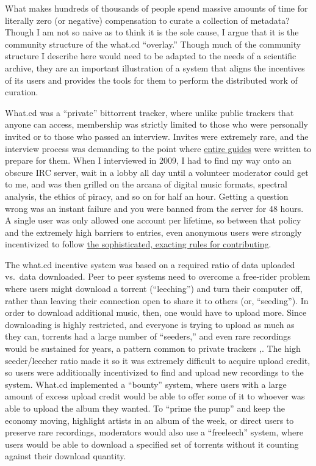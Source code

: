 \documentclass[nohyper]{tufte-book-jls}
\begin{document}
What makes hundreds of thousands of people spend massive amounts of time
for literally zero (or negative) compensation to curate a collection of
metadata? Though I am not so naive as to think it is the sole cause, I
argue that it is the community structure of the what.cd ``overlay.''
Though much of the community structure I describe here would need to be
adapted to the needs of a scientific archive, they are an important
illustration of a system that aligns the incentives of its users and
provides the tools for them to perform the distributed work of curation.

What.cd was a ``private'' bittorrent tracker, where unlike public
trackers that anyone can access, membership was strictly limited to
those who were personally invited or to those who passed an interview.
Invites were extremely rare, and the interview process was demanding to
the point where
\href{https://opentrackers.org/whatinterviewprep.com/index.html}{entire
guides} were written to prepare for them. When I interviewed in 2009, I
had to find my way onto an obscure IRC server, wait in a lobby all day
until a volunteer moderator could get to me, and was then grilled on the
arcana of digital music formats, spectral analysis, the
ethics of piracy, and so on for half an hour. Getting a question wrong
was an instant failure and you were banned from the server for 48 hours.
A single user was only allowed one account per lifetime, so between that
policy and the extremely high barriers to entries, even anonymous users
were strongly incentivized to follow
\href{https://opentrackers.org/whatinterviewprep.com/prepare-for-the-interview/what-cd-rules/index.html}{the
sophisticated, exacting rules for contributing}.

The what.cd incentive system was based on a required ratio of data
uploaded vs.~data downloaded. Peer to peer systems need to overcome a
free-rider problem where users might download a torrent (``leeching'')
and turn their computer off, rather than leaving their connection open
to share it to others (or, ``seeding''). In order to download additional
music, then, one would have to upload more. Since downloading is highly
restricted, and everyone is trying to upload as much as they can,
torrents had a large number of ``seeders,'' and even rare recordings
would be sustained for years, a pattern common to private trackers \cite{liuUnderstandingImprovingRatio2010},.
The high seeder/leecher ratio made it so it was extremely difficult to
acquire upload credit, so users were additionally incentivized to find
and upload new recordings to the system. What.cd implemented a
``bounty'' system, where users with a large amount of excess upload
credit would be able to offer some of it to whoever was able to upload
the album they wanted. To ``prime the pump'' and keep the economy
moving, highlight artists in an album of the week, or direct users to
preserve rare recordings, moderators would also use a ``freeleech''
system, where users would be able to download a specified set of
torrents without it counting against their download quantity.
\end{document}
